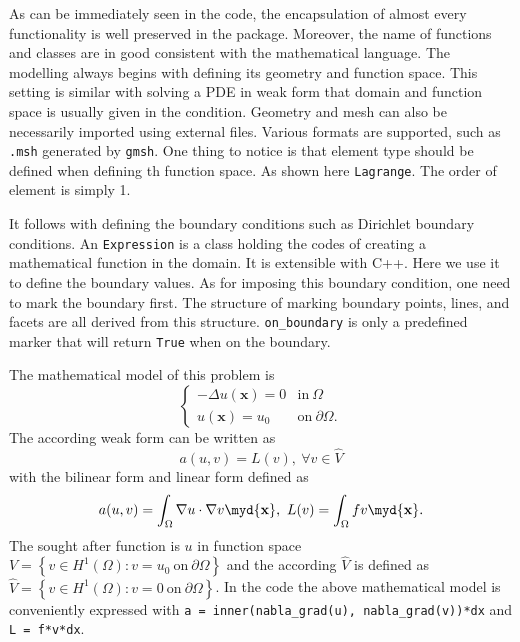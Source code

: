 As can be immediately seen in the code, the encapsulation of almost every functionality is well preserved in the package. Moreover, the name of functions and classes are in good consistent with the mathematical language. The modelling always begins with defining its geometry and function space. This setting is similar with solving a PDE in weak form that domain and function space is usually given in the condition. Geometry and mesh can also be necessarily imported using external files. Various formats are supported, such as \texttt{.msh} generated by \texttt{gmsh}. One thing to notice is that element type should be defined when defining th function space. As shown here \texttt{Lagrange}. The order of element is simply 1.

It follows with defining the boundary conditions such as Dirichlet boundary conditions. An \texttt{Expression} is a class holding the codes of creating a mathematical function in the domain. It is extensible with C++. Here we use it to define the boundary values. As for imposing this boundary condition, one need to mark the boundary first. The structure of marking boundary points, lines, and facets are all derived from this structure. \texttt{on\_boundary} is only a predefined marker that will return \texttt{True} when on the boundary.

The mathematical model of this problem is 
\begin{equation}
\label{eq: poisson}
\left\{
\begin{array}{ll}
-\Delta u(\mathbf{x})=0 & \text{in} \ \Omega \\
u(\mathbf{x})=u_{0} & \text{on} \ \partial \Omega .
\end{array}
\right.
\end{equation}
The according weak form can be written as
\begin{equation}
\label{eq: weak}
a(u,v) = L(v), \ \forall v \in \hat{V}
\end{equation}
with the bilinear form and linear form defined as
\[
a(u,v) = \int_{\Omega} \nabla{u} \cdot \nabla{v} \myd{\mathbf{x}}, \ L(v) = \int_{\Omega} fv \myd{\mathbf{x}}.
\]
The sought after function is $u$ in function space $V = \left\lbrace v \in H^{1}\left( \Omega \right) : v=u_{0} \  \text{on} \ \partial \Omega \right\rbrace$ and the according $\hat{V}$ is defined as $\hat{V} = \left\lbrace v \in H^{1}\left( \Omega \right) : v=0 \  \text{on} \ \partial \Omega \right\rbrace$. In the code the above mathematical model is conveniently expressed with \texttt{a\ =\ inner(nabla\_grad(u),\ nabla\_grad(v))*dx} and \texttt{L\ =\ f*v*dx}.

